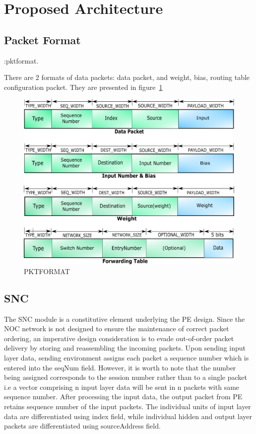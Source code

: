 \section{Proposed Architecture}

\subsection{Packet Format}:pktformat.  

There are 2 formats of data packets: data packet, and weight, bias, routing table  configuration packet. They are presented in figure~\ref{figure:pktformat}
\begin{figure}[h!]
    \includegraphics[width=\columnwidth]{Figures/pktformat.pdf}
    \caption{PKTFORMAT} 
    \label{figure:pktformat}
\end{figure}


\subsection{SNC}
The SNC module is a constitutive element underlying the PE design. Since the NOC network is not
designed to ensure the maintenance of correct packet ordering, an imperative design consideration is to
evade out-of-order packet delivery by storing and reassembling the incoming packets. Upon sending
input layer data, sending environment assigns each packet a sequence number which is entered into the
seqNum field. However, it is worth to note that the number being assigned corresponds to the session
number rather than to a single packet i.e a vector comprising n input layer data will be sent in n packets
with same sequence number. After processing the input data, the output packet from PE retains
sequence number of the input packets. The individual units of input layer data are differentiated using
index field, while individual hidden and output layer packets are differentiated using sourceAddress
field.

